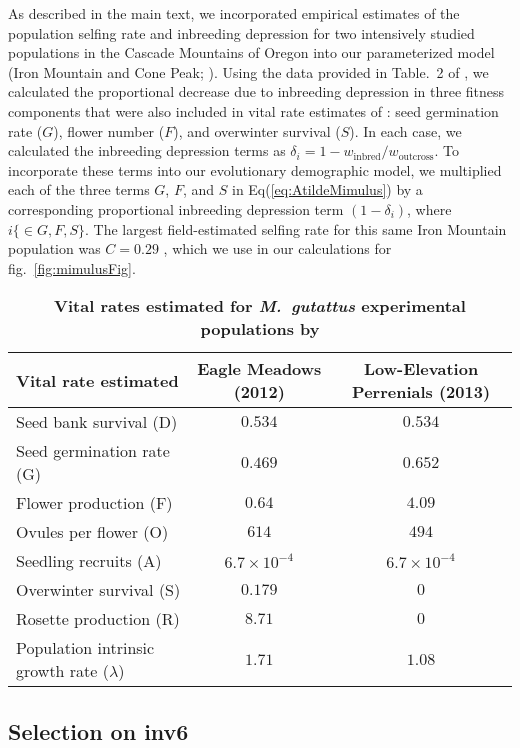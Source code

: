 \documentclass[11pt]{article}
\begin{document}
As described in the main text, we incorporated empirical estimates of the population selfing rate and inbreeding depression for two intensively studied populations in the Cascade Mountains of Oregon into our parameterized model (Iron Mountain and Cone Peak; \citealt{Willis1993,Willis1999a,Willis1999b}). Using the data provided in Table.~2 of \citet{Willis1993}, we calculated the proportional decrease due to inbreeding depression in three fitness components that were also included in vital rate estimates of \citet{PetersonEtAl2016}: seed germination rate ($G$), flower number ($F$), and overwinter survival ($S$). In each case, we calculated the inbreeding depression terms as $\delta_i = 1 - w_{\text{inbred}}/w_{\text{outcross}}$. To incorporate these terms into our evolutionary demographic model, we multiplied each of the three terms $G$, $F$, and $S$ in Eq(\ref{eq:AtildeMimulus}) by a corresponding proportional inbreeding depression term $(1 - \delta_i)$, where $i \{\in G,F,S\}$. The largest field-estimated selfing rate for this same Iron Mountain population was $C = 0.29$ \citep{Willis1993}, which we use in our calculations for fig.~\ref{fig:mimulusFig}.


\begin{table}[htbp]
 \centering
 \caption{\bf Vital rates estimated for {\itshape M.~gutattus} experimental populations by \citet{PetersonEtAl2016}}
\label{tab:MimDemData}
\begin{tabular}{lcc}
 \toprule
 Vital rate estimated &  Eagle Meadows (2012) & Low-Elevation Perrenials (2013)\\ \hline
 Seed bank survival (D) & $0.534$ & $0.534$ \\
 Seed germination rate (G) & $0.469$ & $0.652$ \\
 Flower production (F) & $0.64$ & $4.09$ \\
 Ovules per flower (O) & $614$ & $494$ \\
 Seedling recruits (A) & $6.7 \times 10^{-4}$ & $6.7 \times 10^{-4}$ \\
 Overwinter survival (S) & $0.179$ & $0$ \\
 Rosette production (R) & $8.71$ & $0$ \\
\hline
 Population intrinsic growth rate ($\lambda$) & $1.71$ & $1.08$ \\
 \hline
\end{tabular}
\end{table}


\subsection*{Selection on inv6}
\end{document}
